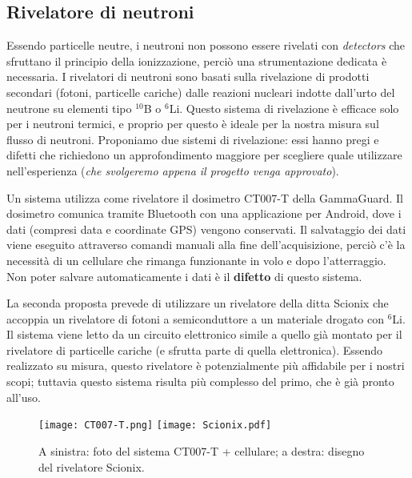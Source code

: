 \subsection{Rivelatore di neutroni}
Essendo particelle neutre, i neutroni non possono essere rivelati con \emph{detectors} che sfruttano il principio della ionizzazione, perciò una strumentazione dedicata è necessaria.
I rivelatori di neutroni sono basati sulla rivelazione di prodotti secondari (fotoni, particelle cariche) dalle reazioni nucleari indotte dall'urto del neutrone su elementi tipo $^{10}$B o $^6$Li. Questo sistema di rivelazione è efficace solo per i neutroni termici, e proprio per questo è ideale per la nostra misura sul flusso di neutroni. 
Proponiamo due sistemi di rivelazione: essi hanno pregi e difetti che richiedono un approfondimento maggiore per scegliere quale utilizzare nell'esperienza (\emph{che svolgeremo appena il progetto venga approvato}). 

Un sistema utilizza come rivelatore il dosimetro CT007-T della GammaGuard. Il dosimetro comunica tramite Bluetooth con una applicazione per Android, dove i dati (compresi data e coordinate GPS) vengono conservati. Il salvataggio dei dati viene eseguito attraverso comandi manuali alla fine dell'acquisizione, perciò c'è la necessità di un cellulare che rimanga funzionante in volo e dopo l'atterraggio. Non poter salvare automaticamente i dati è il \textbf{difetto} di questo sistema.

La seconda proposta prevede di utilizzare un rivelatore della ditta Scionix che accoppia un rivelatore di fotoni a semiconduttore a un materiale drogato con $^6$Li. Il sistema viene letto da un circuito elettronico simile a quello già montato per il rivelatore di particelle cariche (e sfrutta parte di quella elettronica). Essendo realizzato su misura, questo rivelatore è potenzialmente più affidabile per i nostri scopi; tuttavia questo sistema risulta più complesso del primo, che è già pronto all'uso. 

\begin{figure}
    \centering
    \texttt{[image: CT007-T.png]}
    \quad
    \texttt{[image: Scionix.pdf]}
    \caption{A sinistra: foto del sistema CT007-T + cellulare; a destra: disegno del rivelatore Scionix.}
    \label{fig:my_label}
\end{figure}
